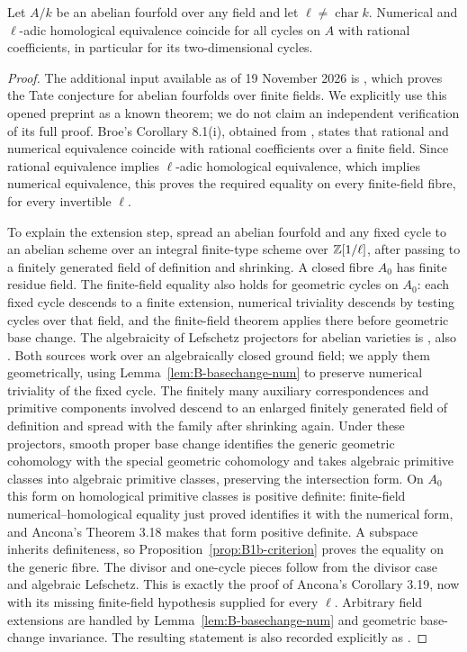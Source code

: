 \begin{theorem}\label{thm:B1b-abelian}
Let $A/k$ be an abelian fourfold over any field and let
$\ell\ne\operatorname{char}k$. Numerical and $\ell$-adic homological
equivalence coincide for all cycles on $A$ with rational coefficients,
in particular for its two-dimensional cycles.
\end{theorem}
\begin{proof}
The additional input available as of 19 November 2026 is
\cite[Theorem 1.1]{BBroe2026}, which proves the Tate conjecture for
abelian fourfolds over finite fields. We explicitly use this opened
preprint as a known theorem; we do not claim an independent verification
of its full proof. Broe's Corollary 8.1(i), obtained from
\cite[Th\'eor\`eme 1, p.~978]{BKahn2003}, states that rational and numerical
equivalence coincide with rational coefficients over a finite field.
Since rational equivalence implies $\ell$-adic homological equivalence,
which implies numerical equivalence, this proves the required equality
on every finite-field fibre, for every invertible $\ell$.

To explain the extension step, spread an abelian fourfold and any fixed
cycle to an abelian scheme over an integral finite-type scheme over
${\mathbb{Z}}[1/\ell]$, after passing to a finitely generated field of definition
and shrinking. A closed fibre $A_0$ has finite residue field. The
finite-field equality also holds for geometric cycles on $A_0$: each
fixed cycle descends to a finite extension, numerical triviality descends
by testing cycles over that field, and the finite-field theorem applies
there before geometric base change.
The algebraicity of Lefschetz projectors for abelian varieties is
\cite[Theorem 2A11, p.~377]{BKleiman1968}, also
\cite[Proposition 4-3(2)(c), p.~16]{BKleiman1994}.
Both sources work over an algebraically closed ground field; we apply
them geometrically, using Lemma~\ref{lem:B-basechange-num} to preserve
numerical triviality of the fixed cycle. The finitely many auxiliary
correspondences and primitive components involved descend to an enlarged
finitely generated field of definition and spread with the family after
shrinking again.
Under these projectors, smooth proper
base change identifies the generic geometric cohomology with the special
geometric cohomology and takes algebraic primitive classes into algebraic
primitive classes, preserving the intersection form.
On $A_0$ this form on homological primitive classes is positive definite:
finite-field numerical--homological equality just proved identifies it
with the numerical form, and Ancona's Theorem 3.18 makes that form
positive definite. A subspace inherits definiteness, so
Proposition~\ref{prop:B1b-criterion} proves the equality on the generic
fibre. The divisor and one-cycle pieces follow from the divisor case and
algebraic Lefschetz. This is exactly the proof of Ancona's
Corollary 3.19, now with its missing finite-field hypothesis supplied for
every $\ell$. Arbitrary field extensions are handled by
Lemma~\ref{lem:B-basechange-num} and geometric base-change invariance.
The resulting statement is also recorded explicitly as
\cite[Corollaries 1.2 and 8.2]{BBroe2026}.
\end{proof}

